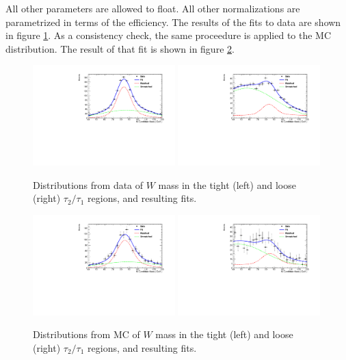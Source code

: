 All other parameters are allowed to float. All other normalizations are parametrized in terms of the efficiency. The results of the fits to data are shown in figure \ref{fig:datafits}. As a consistency check, the same proceedure is applied to the MC distribution. The result of that fit is shown in figure \ref{fig:mcfits}.
\begin{figure}[h!]
\centering
        \includegraphics[width=0.49\textwidth]{EXO-12-024/figs/WtagSF/MCTIGHT.pdf}
	\includegraphics[width=0.49\textwidth]{EXO-12-024/figs/WtagSF/MCLOOSE.pdf}
        \caption{Distributions from data of $W$ mass in the tight (left) and loose (right) $\tau_2/\tau_1$ regions, and resulting fits.}\label{fig:datafits}
\end{figure}
\begin{figure}[h!]
\centering
        \includegraphics[width=0.49\textwidth]{EXO-12-024/figs/WtagSF/TIGHT.pdf}
	\includegraphics[width=0.49\textwidth]{EXO-12-024/figs/WtagSF/LOOSE.pdf}
        \caption{Distributions from MC of $W$ mass in the tight (left) and loose (right) $\tau_2/\tau_1$ regions, and resulting fits.}\label{fig:mcfits}
\end{figure}

